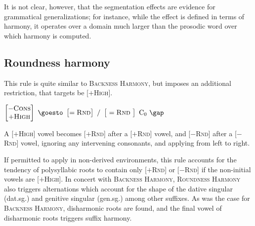 It is not clear, however, that the segmentation effects are evidence for grammatical generalizations; for instance, while the effect is defined in terms of harmony, it operates over a domain much larger than the prosodic word over which harmony is computed.

\subsection{Roundness harmony}

This rule is quite similar to \textsc{Backness Harmony}, but imposes an additional restriction, that targets be [$+$\textsc{High}]. 

\begin{example}
$\begin{bmatrix} -\textsc{Cons} \\ +\textsc{High} \end{bmatrix}~\goesto~\begin{bmatrix} =\textsc{Rnd} \end{bmatrix}~/~\begin{bmatrix}~=\textsc{Rnd}~\end{bmatrix}~\textrm{C}_0~\gap$
\end{example}

\noindent
A [$+$\textsc{High}] vowel becomes [$+$\textsc{Rnd}] after a [$+$\textsc{Rnd}] vowel, and [$-$\textsc{Rnd}] after a [$-$\textsc{Rnd}] vowel, ignoring any intervening consonants, and applying from left to right. 

If permitted to apply in non-derived environments, this rule accounts for the tendency of polysyllabic roots to contain only [$+$\textsc{Rnd}] or [$-$\textsc{Rnd}] if the non-initial vowels are [$+$\textsc{High}]. In concert with \textsc{Backness Harmony}, \textsc{Roundness Harmony} also triggers alternations which account for the shape of the dative singular (dat.sg.) and genitive singular (gen.sg.) among other suffixes. As was the case for \textsc{Backness Harmony}, disharmonic roots are found, and the final vowel of disharmonic roots triggers suffix harmony.

